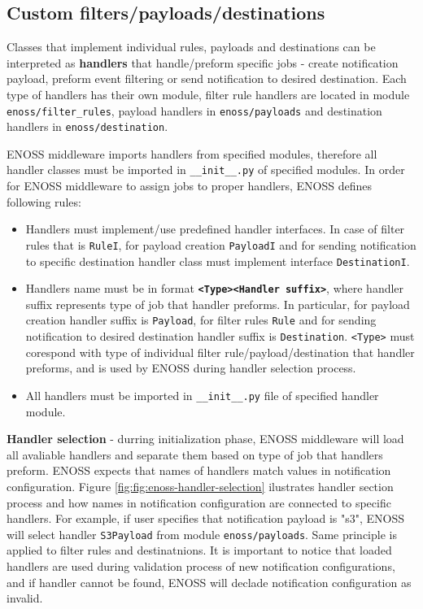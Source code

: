     \subsection{Custom filters/payloads/destinations}

    Classes that implement individual rules, payloads and destinations can be interpreted as \textbf{handlers} that handle/preform specific jobs - create notification payload, preform event filtering or send notification to desired destination. Each type of handlers has their own module, filter rule handlers are located in module \texttt{enoss/filter\_rules}, payload handlers in \texttt{enoss/payloads} and destination handlers in \texttt{enoss/destination}.

    ENOSS middleware imports handlers from specified modules, therefore all handler classes must be imported in \texttt{\_\_init\_\_.py} of specified modules. In order for ENOSS middleware to assign jobs to proper handlers, ENOSS defines following rules:
    \begin{itemize}
        \item Handlers must implement/use predefined handler interfaces. In case of filter rules that is \texttt{RuleI}, for payload creation \texttt{PayloadI} and for sending notification to specific destination handler class must implement interface \texttt{DestinationI}.
        \item Handlers name must be in format \textbf{\texttt{<Type><Handler suffix>}}, where handler suffix represents type of job that handler preforms. In particular, for payload creation handler suffix is \texttt{Payload}, for filter rules \texttt{Rule} and for sending notification to desired destination handler suffix is \texttt{Destination}. \texttt{<Type>} must corespond with type of individual filter rule/payload/destination that handler preforms, and is used by ENOSS during handler selection process.
        \item All handlers must be imported in \texttt{\_\_init\_\_.py} file of specified handler module.
    \end{itemize}

    \textbf{Handler selection} - durring initialization phase, ENOSS middleware will load all avaliable handlers and separate them based on type of job that handlers preform. ENOSS expects that names of handlers match values in notification configuration. Figure \ref{fig:fig:enoss-handler-selection} ilustrates handler section process and how names in notification configuration are connected to specific handlers. For example, if user specifies that notification payload is "s3", ENOSS will select handler \texttt{S3Payload} from module \texttt{enoss/payloads}. Same principle is applied to filter rules and destinatnions. It is important to notice that loaded handlers are used during validation process of new notification configurations, and if handler cannot be found, ENOSS will declade notification configuration as invalid.

